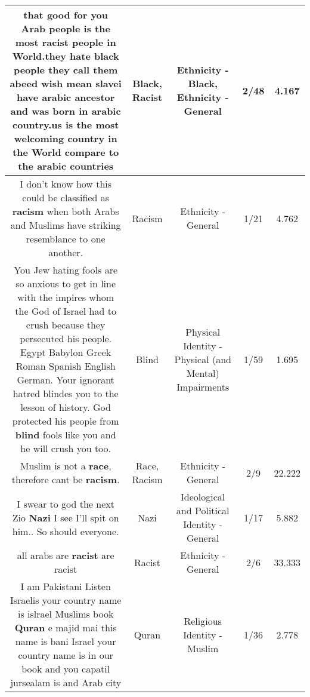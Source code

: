 \documentclass[11pt]{article}
\newlength\mylength
\begin{document}
\begin{center}
\begin{longtable}{|C{.65\mylength}|C{.30\mylength}|C{.12\mylength}|C{.12\mylength}|C{.12\mylength}|}
  \small that good for you Arab people is the most \textbf{racist} people in World.they hate \textbf{black} people they call them abeed wish mean slavei have arabic ancestor and was born in arabic country.us is the most welcoming country in the World compare to the arabic countries\normalsize   & Black, Racist & Ethnicity - Black, Ethnicity - General & 2/48 & 4.167 \\  \hline
  \small I don't know how this could be classified as \textbf{racism} when both Arabs and Muslims have striking resemblance to one another.\normalsize   & Racism & Ethnicity - General & 1/21 & 4.762 \\  \hline
  \small You Jew hating fools are so anxious to get in line with the impires whom the God of Israel had to crush because they persecuted his people.  Egypt Babylon Greek Roman Spanish English German. Your ignorant hatred blindes you to the lesson of history. God protected his people from \textbf{blind} fools like you and he will crush you too.\normalsize   & Blind & Physical Identity - Physical (and Mental) Impairments & 1/59 & 1.695 \\  \hline
  \small Muslim is not a \textbf{race}, therefore cant be \textbf{racism}.\normalsize   & Race, Racism & Ethnicity - General & 2/9 & 22.222 \\  \hline
  \small I swear to god the next Zio \textbf{Nazi} I see I'll spit on him.. So should everyone.\normalsize   & Nazi &  Ideological and Political Identity - General & 1/17 & 5.882 \\  \hline
  \small all arabs are \textbf{racist} are racist\normalsize   & Racist & Ethnicity - General & 2/6 & 33.333 \\  \hline
  \small I am Pakistani Listen Israelis your country name is islrael Muslims book \textbf{Quran} e majid mai this name is bani Israel your country name is in our book and you capatil jursealam is and Arab city\normalsize   & Quran & Religious Identity - Muslim & 1/36 & 2.778 \\  \hline

\end{longtable}
\end{center}
\end{document}
